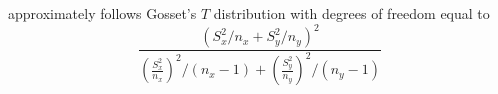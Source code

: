 \documentclass[12pt]{article}
\begin{document}
\begin{enumerate}[1.]
$$$$
approximately follows Gosset's $T$ distribution with degrees of freedom equal to
$$
\frac{\left(S_x^2 / n_x + S_y^2/n_y\right)^2}
     {\left(\frac{S_x^2}{n_x}\right)^2 / (n_x - 1) +
      \left(\frac{S_y^2}{n_y}\right)^2 / (n_y - 1)}
$$

\end{enumerate}
\end{document}
